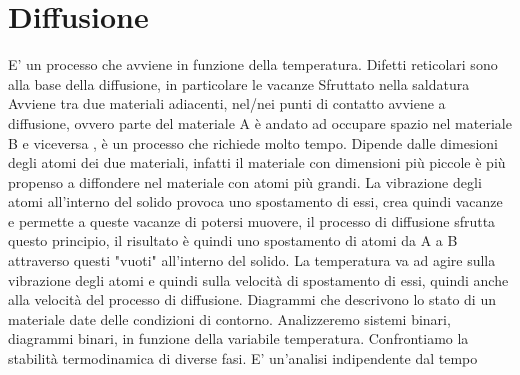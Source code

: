 \documentclass{article}%
\begin{document}
%
\normalsize%
\section{ Diffusione }%
\label{sec:Diffusione}%
E' un processo che avviene in funzione della temperatura.\newline%
%
Difetti reticolari sono alla base della diffusione, in particolare le vacanze\newline%
%
Sfruttato nella saldatura\newline%
%
Avviene tra due materiali adiacenti, nel/nei punti di contatto avviene a diffusione, ovvero parte del materiale A\newline%
%
è andato ad occupare spazio nel materiale B e viceversa , è un processo che richiede molto tempo.\newline%
%
Dipende dalle dimesioni degli atomi dei due materiali, infatti il materiale con dimensioni più piccole è più \newline%
%
propenso a diffondere nel materiale con atomi più grandi.\newline%
%
La vibrazione degli atomi all'interno del solido provoca uno spostamento di essi, crea quindi vacanze e permette\newline%
%
a queste vacanze di potersi muovere, il processo di diffusione sfrutta questo principio, il risultato è quindi uno\newline%
%
spostamento di atomi da A a B attraverso questi "vuoti" all'interno del solido.\newline%
%
La temperatura va ad agire sulla vibrazione degli atomi e quindi sulla velocità di spostamento di essi, quindi\newline%
%
anche alla velocità del processo di diffusione.\newline%
%
\newline%
%
\newline%
%
Diagrammi che descrivono lo stato di un materiale date delle condizioni di contorno.\newline%
%
Analizzeremo sistemi binari, diagrammi binari, in funzione della variabile temperatura.\newline%
%
Confrontiamo la stabilità termodinamica di diverse fasi.\newline%
%
E' un'analisi indipendente dal tempo\newline%
%
\newline%
%
\end{document}
